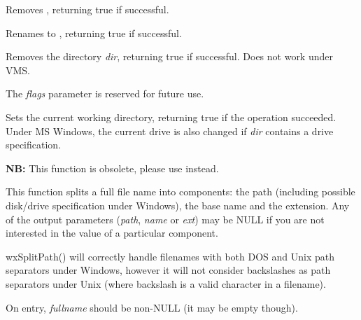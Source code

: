 \label{wxremovefile}


Removes , returning true if successful.


\label{wxrenamefile}


Renames  to , returning true if successful.


\label{wxrmdir}


Removes the directory {\it dir}, returning true if successful. Does not work under VMS.

The {\it flags} parameter is reserved for future use.


\label{wxsetworkingdirectory}


Sets the current working directory, returning true if the operation succeeded.
Under MS Windows, the current drive is also changed if {\it dir} contains a drive specification.


\label{wxsplitfunction}


{\bf NB:} This function is obsolete, please use
 instead.

This function splits a full file name into components: the path (including possible disk/drive
specification under Windows), the base name and the extension. Any of the output parameters
({\it path}, {\it name} or {\it ext}) may be NULL if you are not interested in the value of
a particular component.

wxSplitPath() will correctly handle filenames with both DOS and Unix path separators under
Windows, however it will not consider backslashes as path separators under Unix (where backslash
is a valid character in a filename).

On entry, {\it fullname} should be non-NULL (it may be empty though).

